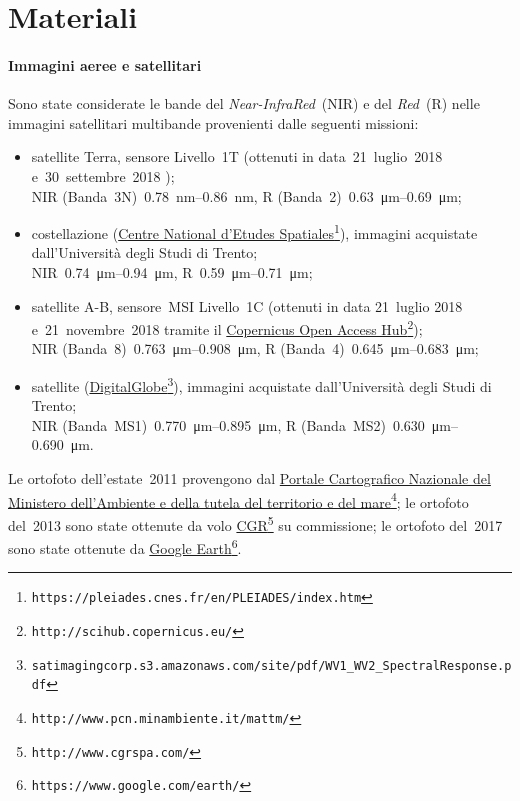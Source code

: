 \section{Materiali}
\paragraph{Immagini aeree e satellitari}
Sono state considerate le bande del \emph{Near-InfraRed}~(NIR) e del \emph{Red}~(R) nelle immagini satellitari multibande provenienti dalle seguenti missioni:
%
\begin{itemize}
	\item satellite Terra, sensore \AST{} Livello~1T (ottenuti in data~21~luglio~2018 e~30~settembre~2018 );  
		\\
		NIR (Banda~3N)~\SIrange[range-phrase={-}]{0.78}{0.86}{\nano\m}, R (Banda~2)~\SIrange[range-phrase={-}]{0.63}{0.69}{\micro\m};
	\item costellazione \Pl{} (\href{https://pleiades.cnes.fr/en/PLEIADES/index.htm}{Centre National d'Etudes Spatiales}\footnote{\texttt{https://pleiades.cnes.fr/en/PLEIADES/index.htm}}), immagini acquistate dall'Università degli Studi di Trento; 
		\\
		NIR~\SIrange[range-phrase={-}]{0.74}{0.94}{\micro\m}, R~\SIrange[range-phrase={-}]{0.59}{0.71}{\micro\m};
	\item satellite \Se{}A-B, sensore~MSI Livello~1C (ottenuti in data 21~luglio 2018 e~21~novembre~2018 tramite il \href{http://scihub.copernicus.eu/}{Copernicus Open Access Hub}\footnote{\texttt{http://scihub.copernicus.eu/}});
		\\
		NIR (Banda~8)~\SIrange[range-phrase={-}]{0.763}{0.908}{\micro\m}, R (Banda~4)~\SIrange[range-phrase={-}]{0.645}{0.683}{\micro\m};
	\item satellite \WV{} (\href{satimagingcorp.s3.amazonaws.com/site/pdf/WV1\_{}WV2\_{}SpectralResponse.pdf}{DigitalGlobe}\footnote{\texttt{satimagingcorp.s3.amazonaws.com/site/pdf/WV1\_{}WV2\_{}SpectralResponse.pdf}}), immagini acquistate dall'Università degli Studi di Trento;
		\\
		NIR (Banda~MS1)~\SIrange[range-phrase={-}]{0.770}{0.895}{\micro\m}, R (Banda~MS2)~\SIrange[range-phrase={-}]{0.630}{0.690}{\micro\m}.
\end{itemize}
%

Le ortofoto dell'estate~2011 provengono dal \href{http://www.pcn.minambiente.it/mattm/}{Portale Cartografico Nazionale del Ministero dell'Ambiente e della tutela del territorio e del mare}\footnote{\texttt{http://www.pcn.minambiente.it/mattm/}};
le ortofoto del~2013 sono state ottenute da volo \href{http://www.cgrspa.com/}{CGR}\footnote{\texttt{http://www.cgrspa.com/}} su commissione; 
le ortofoto del~2017 sono state ottenute da \href{https://www.google.com/earth/}{Google Earth}\footnote{\texttt{https://www.google.com/earth/}}.

